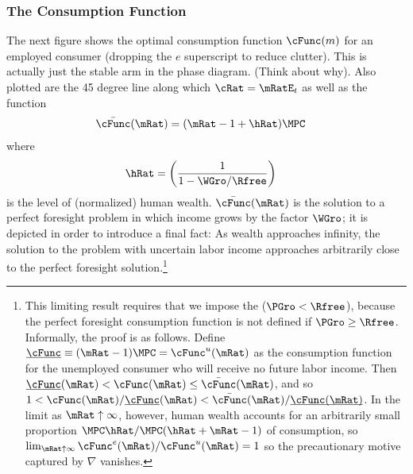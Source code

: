 \documentclass{\handout}
\begin{document}
\subsubsection{The Consumption Function}
The next figure shows the optimal consumption function $\cFunc(m)$ for an
employed consumer (dropping the $e$ superscript to reduce clutter).  This
is actually just the stable arm in the phase diagram.  (Think about
why).  Also plotted are the 45 degree line along which $\cRat = \mRatE_{t}$
as well as the function
\begin{equation}\begin{gathered}\begin{aligned}
  \bar{\cFunc}(\mRat) & =  (\mRat-1+\hRat)\MPCU
\end{aligned}\end{gathered}\end{equation}
where
\begin{equation}\begin{gathered}\begin{aligned}
  \hRat & =  \left(\frac{1}{1-\WGro/\Rfree}\right)
\end{aligned}\end{gathered}\end{equation}
is the level of (normalized) human wealth.  $\bar{\cFunc}(\mRat)$ is the
solution to a perfect foresight problem in which income 
grows by the factor $\WGro$; it is depicted in order to
introduce a final fact: As wealth approaches infinity, the solution
to the problem with uncertain labor income approaches arbitrarily
close to the perfect foresight solution.\footnote{This
  limiting result requires that we impose the \FHWCPGro ($\PGro < \Rfree$), because the perfect foresight consumption function is
  not defined if $\PGro \geq \Rfree$.  Informally, the proof is as follows.  Define $\underbar{\cFunc}\equiv (\mRat-1)\MPCU=\cFunc^{u}(\mRat)$ as the consumption function for the unemployed consumer who will receive no future labor income.  Then$\underbar{\cFunc}(\mRat) < \cFunc(\mRat) \leq \bar{\cFunc}(\mRat)$, and so $1 < \cFunc(\mRat)/\underbar{\cFunc}(\mRat)<\bar{\cFunc}(\mRat)/\underbar{\cFunc(\mRat)}$. In the limit as $\mRat \uparrow \infty$, however, human wealth accounts for an arbitrarily small proportion $\MPCU \hRat/\MPCU (\hRat+\mRat-1)$ of consumption, so $\lim_{\mRat \uparrow \infty} \cFunc^{e}(\mRat)/\cFunc^{u}(\mRat) = 1$ so the precautionary motive captured by $\nabla$ vanishes.}
\end{document}
